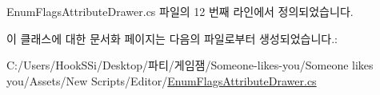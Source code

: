 Enum\+Flags\+Attribute\+Drawer.\+cs 파일의 12 번째 라인에서 정의되었습니다.


\begin{DoxyCode}{0}

\end{DoxyCode}


이 클래스에 대한 문서화 페이지는 다음의 파일로부터 생성되었습니다.\+:\begin{DoxyCompactItemize}
\item 
C\+:/\+Users/\+Hook\+S\+Si/\+Desktop/파티/게임잼/\+Someone-\/likes-\/you/\+Someone likes you/\+Assets/\+New Scripts/\+Editor/\mbox{\hyperlink{_enum_flags_attribute_drawer_8cs}{Enum\+Flags\+Attribute\+Drawer.\+cs}}\end{DoxyCompactItemize}
